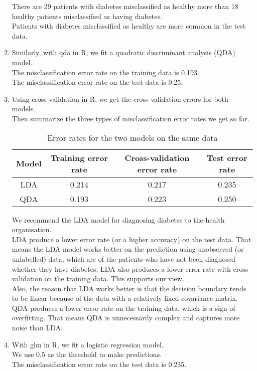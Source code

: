 \documentclass[10pt]{article}
\begin{document}
\begin{enumerate}[1)]
There are 29 patients with diabetes misclassified as healthy more than 18 healthy patients misclassified as having diabetes.\\
Patients with diabetes misclassified as healthy are more common in the test data.

\item
Similarly, with {\ttfamily qda} in R, we fit a quadratic discriminant analysis (QDA) model.\\
The misclassification error rate on the training data is 0.193.\\
The misclassification error rate on the test data is 0.25.

\item
Using cross-validation in R, we get the cross-validation errors for both models.\\
Then summarize the three types of misclassification error rates we get so far.\\
\begin{table}[H]
\centering
\begin{tabular}{|c|ccc|}
\hline
Model & Training error rate & Cross-validation error rate & Test error rate \\ \hline
LDA   & 0.214               & 0.217                       & 0.235           \\
QDA   & 0.193               & 0.223                       & 0.250           \\ \hline
\end{tabular}
\caption{Error rates for the two models on the same data}
\end{table}

We recommend the LDA model for diagnosing diabetes to the health organisation.\\
LDA produce a lower error rate (or a higher accuracy) on the test data. That means the LDA model works better on the prediction using unobserved (or unlabelled) data, which are of the patients who have not been diagnosed whether they have diabetes. LDA also produces a lower error rate with cross-validation on the training data. This supports our view.\\
Also, the reason that LDA works better is that the decision boundary tends to be linear because of the data with a relatively fixed covariance matrix. QDA produces a lower error rate on the training data, which is a sign of overfitting. That means QDA is unnecessarily complex and captures more noise than LDA.

\item
With {\ttfamily glm} in R, we fit a logistic regression model.\\
We use 0.5 as the threshold to make predictions.\\
The misclassification error rate on the test data is 0.235.


\end{enumerate}
\end{document}
